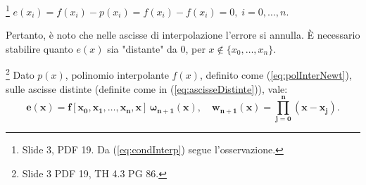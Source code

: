 \begin{remark}
    \footnote{Slide 3, PDF 19. Da (\ref{eq:condInterp}) segue l'osservazione.} $e(x_i)=f(x_i)-p(x_i)=f(x_i)-f(x_i)=0,\; i=0,\hdots,n.$
\end{remark}

Pertanto, è noto che nelle ascisse di interpolazione l'errore si annulla. È necessario stabilire quanto $e(x)$ sia "distante" da 0, per $x\notin \{x_0,\hdots, x_n\}.$

\begin{theorem}\label{th:errInterFormaNewt}
    \footnote{Slide 3 PDF 19, TH 4.3 PG 86.} Dato $p(x)$, polinomio interpolante $f(x)$, definito come (\ref{eq:polInterNewt}), sulle ascisse distinte (definite come in (\ref{eq:ascisseDistinte})), vale:
    \begin{equation}\label{eq:errInterFormaNewt}
        \boldsymbol{e(x)=f[x_0,x_1,\hdots,x_n,x]\,\omega_{n+1}(x),\quad w_{n+1}(x)=\prod_{j=0}^{n}(x-x_j)}.
    \end{equation}
\end{theorem}

